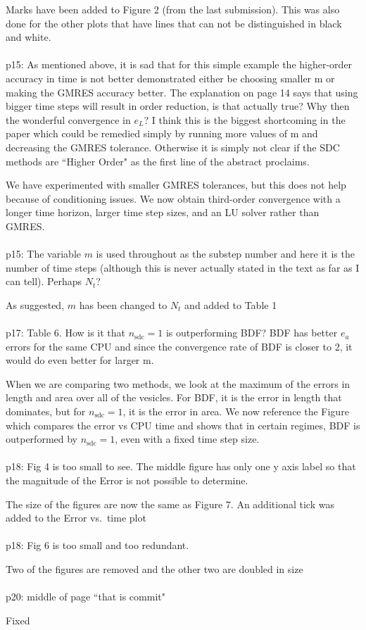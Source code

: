 \documentclass[12pt]{article}
\newcommand{\comment}[1]{{\color{blue} #1}}
\newcommand{\sdc}{{\mathrm{sdc}}}
\begin{document}
Marks have been added to Figure 2 (from the last submission).  This was
also done for the other plots that have lines that can not be
distinguished in black and white.
\\ \\
\comment{p15: As mentioned above, it is sad that for this simple
example the higher-order accuracy in time is not better demonstrated
either be choosing smaller m or making the GMRES accuracy better.  The
explanation on page 14 says that using bigger time steps will result in
order reduction, is that actually true?  Why then the wonderful
convergence in $e_L$?  I think this is the biggest shortcoming in the
paper which could be remedied simply by running more values of m and
decreasing the GMRES tolerance.  Otherwise it is simply not clear if the
SDC methods are ``Higher Order" as the first line of  the abstract
proclaims.}

We have experimented with smaller GMRES tolerances, but this does not
help because of conditioning issues.  We now obtain third-order
convergence with a longer time horizon, larger time step sizes, and an
LU solver rather than GMRES. \\ \\
\comment{p15: The variable $m$ is used throughout as the substep number
and here it is the number of time steps (although this is never actually
stated in the text as far as I can tell).  Perhaps $N_t$?}

As suggested, $m$ has been changed to $N_t$ and added to Table 1 \\ \\
\comment{p17: Table 6.  How is it that $n_{\sdc}=1$ is outperforming
BDF?  BDF has better $e_a$ errors for the same CPU and since the
convergence rate of BDF is closer to 2, it would do even better for
larger m.}

When we are comparing two methods, we look at the maximum of the errors
in length and area over all of the vesicles.  For BDF, it is the error
in length that dominates, but for $n_{\sdc}=1$, it is the error in area.
We now reference the Figure which compares the error vs CPU time and
shows that in certain regimes, BDF is outperformed by $n_{\sdc}=1$, even
with a fixed time step size.
\\ \\
\comment{p18: Fig 4 is too small to see.  The middle figure has only
one y axis label so that the magnitude of the Error is not possible to
determine.}

The size of the figures are now the same as Figure 7.  An additional
tick was added to the Error vs.~time plot \\ \\
\comment{p18: Fig 6 is too small and too redundant.}

Two of the figures are removed and the other two are doubled in size \\
\\
\comment{p20: middle of page ``that is commit"}

Fixed 
\end{document}
